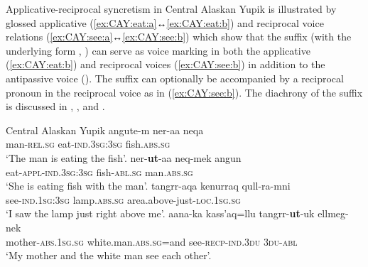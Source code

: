 Applicative-reciprocal syncretism in Central Alaskan Yupik is illustrated by glossed applicative (\ref{ex:CAY:eat:a}↔\ref{ex:CAY:eat:b}) and reciprocal voice relations (\ref{ex:CAY:see:a}↔\ref{ex:CAY:see:b}) which show that the suffix  (with the underlying form , \citealt[830ff.]{miyaoka:2012}) can serve as voice marking in both the applicative (\ref{ex:CAY:eat:b}) and reciprocal voices (\ref{ex:CAY:see:b}) in addition to the antipassive voice (). The suffix can optionally be accompanied by a reciprocal pronoun in the reciprocal voice \citep[928]{miyaoka:2012} as in (\ref{ex:CAY:see:b}). The diachrony of the suffix is discussed in , , and .

\ea Central Alaskan Yupik \citep[656, 844, 929, 953]{miyaoka:2012}
\ea\label{ex:CAY:eat:a}
	\gll	angute-m ner-aa neqa \\
			man-\textsc{rel.sg} eat-\textsc{ind.3sg:3sg} fish.\textsc{abs.sg} \\
	\glt	‘The man is eating the fish’.
\ex\label{ex:CAY:eat:b}
	\gll	ner-\textbf{ut}-aa neq-mek angun \\
			eat-\textsc{appl-ind.3sg:3sg} fish-\textsc{abl.sg} man.\textsc{abs.sg} \\
	\glt	‘She is eating fish with the man’.
\ex\label{ex:CAY:see:a}
	\gll	tangrr-aqa kenurraq qull-ra-mni \\
			see-\textsc{ind.1sg:3sg} lamp.\textsc{abs.sg} area.above-just-\textsc{loc.1sg.sg} \\
	\glt	‘I saw the lamp just right above me’.
\ex\label{ex:CAY:see:b}
	\gll	aana-ka kass’aq=llu tangrr-\textbf{ut}-uk ellmeg-nek \\
			mother-\textsc{abs.1sg.sg} white.man.\textsc{abs.sg}=and see-\textsc{recp-ind.3du} \textsc{3du-abl} \\
	\glt	‘My mother and the white man see each other’.
	\z 
\z

